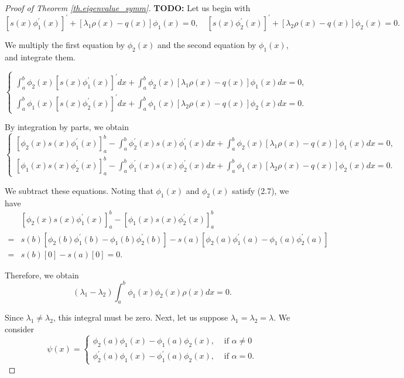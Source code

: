 \begin{proof}[Proof of Theorem \ref{th.eigenvalue_symm}] \textbf{TODO: }
Let us begin with
$$
\left[s(x) \phi_1^{\prime}(x)\right]^{\prime}+\left[\lambda_1 \rho(x)-q(x)\right] \phi_1(x)=0, \quad\left[s(x) \phi_2^{\prime}(x)\right]^{\prime}+\left[\lambda_2 \rho(x)-q(x)\right] \phi_2(x)=0 .
$$

We multiply the first equation by $\phi_2(x)$ and the second equation by $\phi_1(x)$, and integrate them.

$$
\left\{\begin{array}{l}
\int_a^b \phi_2(x)\left[s(x) \phi_1^{\prime}(x)\right]^{\prime} d x+\int_a^b \phi_2(x)\left[\lambda_1 \rho(x)-q(x)\right] \phi_1(x) d x=0, \\
\int_a^b \phi_1(x)\left[s(x) \phi_2^{\prime}(x)\right]^{\prime} d x+\int_a^b \phi_1(x)\left[\lambda_2 \rho(x)-q(x)\right] \phi_2(x) d x=0 .
\end{array}\right.
$$

By integration by parts, we obtain
$$
\left\{\begin{array}{l}
{\left[\phi_2(x) s(x) \phi_1^{\prime}(x)\right]_a^b-\int_a^b \phi_2^{\prime}(x) s(x) \phi_1^{\prime}(x) d x+\int_a^b \phi_2(x)\left[\lambda_1 \rho(x)-q(x)\right] \phi_1(x) d x=0,} \\
{\left[\phi_1(x) s(x) \phi_2^{\prime}(x)\right]_a^b-\int_a^b \phi_1^{\prime}(x) s(x) \phi_2^{\prime}(x) d x+\int_a^b \phi_1(x)\left[\lambda_2 \rho(x)-q(x)\right] \phi_2(x) d x=0 .}
\end{array}\right.
$$

We subtract these equations. Noting that $\phi_1(x)$ and $\phi_2(x)$ satisfy (2.7), we have
$$
\begin{aligned}
& {\left[\phi_2(x) s(x) \phi_1^{\prime}(x)\right]_a^b-\left[\phi_1(x) s(x) \phi_2^{\prime}(x)\right]_a^b } \\
= & s(b)\left[\phi_2(b) \phi_1^{\prime}(b)-\phi_1(b) \phi_2^{\prime}(b)\right]-s(a)\left[\phi_2(a) \phi_1^{\prime}(a)-\phi_1(a) \phi_2^{\prime}(a)\right] \\
= & s(b)[0]-s(a)[0]=0 .
\end{aligned}
$$

Therefore, we obtain
$$
\left(\lambda_1-\lambda_2\right) \int_a^b \phi_1(x) \phi_2(x) \rho(x) d x=0 .
$$

Since $\lambda_1 \neq \lambda_2$, this integral must be zero.
Next, let us suppose $\lambda_1=\lambda_2=\lambda$. We consider
$$
\psi(x)= \begin{cases}\phi_2(a) \phi_1(x)-\phi_1(a) \phi_2(x), & \text { if } \alpha \neq 0 \\ \phi_2^{\prime}(a) \phi_1(x)-\phi_1^{\prime}(a) \phi_2(x), & \text { if } \alpha=0 .\end{cases}
$$


\end{proof}

